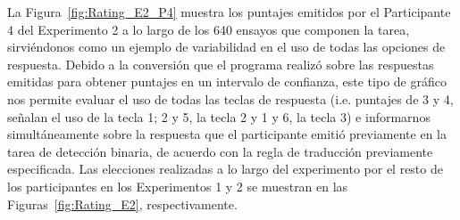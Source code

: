 \begin{itemize}
La Figura~\ref{fig:Rating_E2_P4} muestra los puntajes emitidos por el Participante 4 del Experimento 2 a lo largo de los 640 ensayos que componen la tarea, sirviéndonos como un ejemplo de variabilidad en el uso de todas las opciones de respuesta. Debido a la conversión que el programa realizó sobre las respuestas emitidas para obtener puntajes en un intervalo de confianza, este tipo de gráfico nos permite evaluar el uso de todas las teclas de respuesta (i.e. puntajes de 3 y 4, señalan el uso de la tecla 1; 2 y 5, la tecla 2 y 1 y 6, la tecla 3) e informarnos simultáneamente sobre la respuesta que el participante emitió previamente en la tarea de detección binaria, de acuerdo con la regla de traducción previamente especificada. Las elecciones realizadas a lo largo del experimento por el resto de los participantes en los Experimentos 1 y 2 se muestran en las Figuras~\ref{fig:Rating_E2}, respectivamente.\\

\end{itemize}

